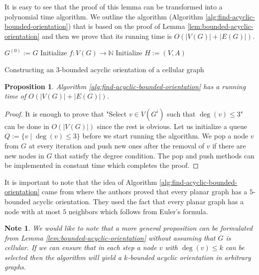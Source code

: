 \documentclass[a4paper, 12pt]{article}
\newtheorem{state}[lem]{Proposition}
\newtheorem{note}[lem]{Note}
\begin{document}
It is easy to see that the proof of this lemma can be transformed into a polynomial time algorithm. We outline the algorithm (Algorithm \ref{alg:find-acyclic-bounded-orientation}) that is based on the proof of Lemma \ref{lem:bounded-acyclic-orientation} and then we prove that its running time is $O(|V(G)| + |E(G)|)$.
\begin{algorithm}\label{alg:find-acyclic-bounded-orientation}
 $G^{(0)} := G$\;
 Initialize $f \colon V(G) \to \mathbb{N}$\;
 Initialize $H:=(V,A)$\;
 \caption{Constructing an $3$-bounded acyclic orientation of a cellular graph}
\end{algorithm}
\begin{state}\label{state:acyclic-complexity-proof} Algorithm \ref{alg:find-acyclic-bounded-orientation} has a running time of $O(|V(G)| + |E(G)|)$.
\end{state}
\begin{proof}
It is enough to prove that "Select $v \in V(G^i)$ such that $\deg(v) \leqslant 3$" can be done in $O(|V(G)|)$ since the rest is obvious. Let us initialize a queue $Q := \lbrace v \mid \deg(v) \leqslant  3\rbrace$ before we start running the algorithm. We pop a node $v$ from $G$ at every iteration and push new ones after the removal of $v$ if there are new nodes in $G$ that satisfy the degree condition. The pop and push methods can be implemented in constant time which completes the proof.
\end{proof}

It is important to note that the idea of Algorithm \ref{alg:find-acyclic-bounded-orientation} came from \cite{CHROBAK1991243} where the authors proved that every planar graph has a $5$-bounded acyclic orientation. They used the fact that every planar graph has a node with at most $5$ neighbors which follows from Euler's formula.

\begin{note} We would like to note that a more general proposition can be formulated from Lemma \ref{lem:bounded-acyclic-orientation} without assuming that $G$ is cellular. If we can ensure that in each step a node $v$ with $\deg(v) \leqslant k$ can be selected then the algorithm will yield a $k$-bounded acyclic orientation in arbitrary graphs.
\end{note}
\end{document}
